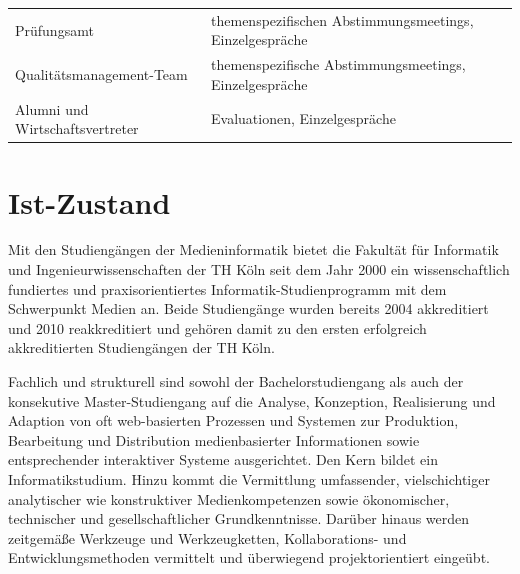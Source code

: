 \begin{longtable}[c]{@{}ll@{}}
\begin{minipage}[t]{0.5\columnwidth}
Prüfungsamt
\strut\end{minipage} &
\begin{minipage}[t]{0.5\columnwidth}\raggedright\strut
themenspezifischen Abstimmungsmeetings, Einzelgespräche
\strut\end{minipage}\tabularnewline
\begin{minipage}[t]{0.5\columnwidth}\raggedright\strut
Qualitätsmanagement-Team
\strut\end{minipage} &
\begin{minipage}[t]{0.5\columnwidth}\raggedright\strut
themenspezifische Abstimmungsmeetings, Einzelgespräche
\strut\end{minipage}\tabularnewline
\begin{minipage}[t]{0.5\columnwidth}\raggedright\strut
Alumni und Wirtschaftsvertreter
\strut\end{minipage} &
\begin{minipage}[t]{0.5\columnwidth}\raggedright\strut
Evaluationen, Einzelgespräche
\strut\end{minipage}\tabularnewline
\bottomrule
\end{longtable}

\chapter{Ist-Zustand}\label{ist-zustand}

Mit den Studiengängen der Medieninformatik bietet die Fakultät für
Informatik und Ingenieurwissenschaften der TH Köln seit dem Jahr 2000
ein wissenschaftlich fundiertes und praxisorientiertes
Informatik-Studienprogramm mit dem Schwerpunkt Medien an. Beide
Studiengänge wurden bereits 2004 akkreditiert und 2010 reakkreditiert
und gehören damit zu den ersten erfolgreich akkreditierten Studiengängen
der TH Köln.

Fachlich und strukturell sind sowohl der Bachelorstudiengang als auch
der konsekutive Master-Studiengang auf die Analyse, Konzeption,
Realisierung und Adaption von oft web-basierten Prozessen und Systemen
zur Produktion, Bearbeitung und Distribution medienbasierter
Informationen sowie entsprechender interaktiver Systeme ausgerichtet.
Den Kern bildet ein Informatikstudium. Hinzu kommt die Vermittlung
umfassender, vielschichtiger analytischer wie konstruktiver
Medienkompetenzen sowie ökonomischer, technischer und gesellschaftlicher
Grundkenntnisse. Darüber hinaus werden zeitgemäße Werkzeuge und
Werkzeugketten, Kollaborations- und Entwicklungsmethoden vermittelt und
überwiegend projektorientiert eingeübt.

